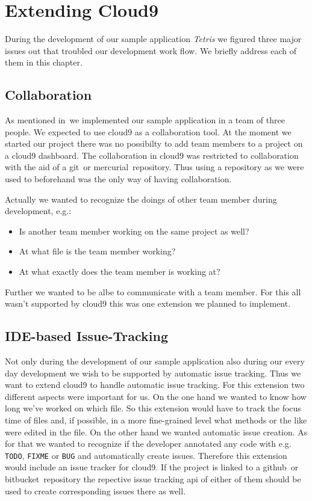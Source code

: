 \section{Extending Cloud9}
\label{sec:Approaches}
During the development of our sample application \emph{Tetris} we figured three major issues out that troubled our development work flow.
We briefly address each of them in this chapter.

\subsection{Collaboration}
As mentioned in~ we implemented our sample application in a team of three people.
We expected to use cloud9 as a collaboration tool.
At the moment we started our project there was no possibilty to add team members to a project on a cloud9 dashboard.
The collaboration in cloud9 was restricted to collaboration with the aid of a git~\needcite or mercurial~\needcite repository.
Thus using a repository as we were used to beforehand was the only way of having collaboration.

Actually we wanted to recognize the doings of other team member during development, e.g.:
\begin{itemize}
    \item Is another team member working on the same project as well?
    \item At what file is the team member working?
    \item At what exactly does the team member is working at?
\end{itemize}
Further we wanted to be albe to communicate with a team member.
For this all wasn't supported by cloud9 this was one extension we planned to implement.

\subsection{IDE-based Issue-Tracking}
Not only during the development of our sample application also during our every day development we wish to be supported by automatic issue tracking.
Thus we want to extend cloud9 to handle automatic issue tracking.
For this extension two different aspects were important for us.
On the one hand we wanted to know how long we've worked on which file.
So this extension would have to track the focus time of files and, if possible, in a more fine-grained level what methods or the like were edited in the file.
On the other hand we wanted automatic issue creation.
As for that we wanted to recognize if the developer annotated any code with e.g. \texttt{TODO}, \texttt{FIXME} or \texttt{BUG} and automatically create issues.
Therefore this extension would include an issue tracker for cloud9.
If the project is linked to a github~\needcite or bitbucket~\needcite repository the repective issue tracking api of either of them should be used to create corresponding issues there as well.

